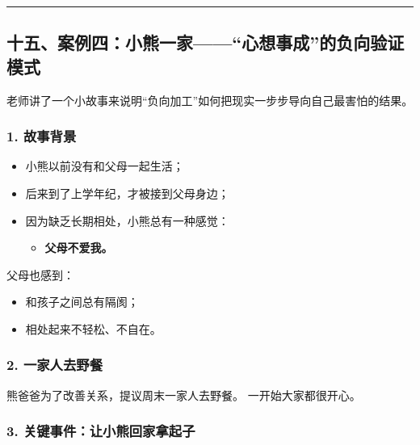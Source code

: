 \documentclass[
  chinese,
  9pt,
  a4paper,
]{ctexart}
\providecommand{\tightlist}{%
  \setlength{\itemsep}{0pt}\setlength{\parskip}{0pt}}
\begin{document}
\begin{center}\rule{0.5\linewidth}{0.5pt}\end{center}

\subsection{十五、案例四：小熊一家------``心想事成''的负向验证模式}\label{ux5341ux4e94ux6848ux4f8bux56dbux5c0fux718aux4e00ux5bb6ux5fc3ux60f3ux4e8bux6210ux7684ux8d1fux5411ux9a8cux8bc1ux6a21ux5f0f}

老师讲了一个小故事来说明``负向加工''如何把现实一步步导向自己最害怕的结果。

\subsubsection{1. 故事背景}\label{ux6545ux4e8bux80ccux666f}

\begin{itemize}
\item
  小熊以前没有和父母一起生活；
\item
  后来到了上学年纪，才被接到父母身边；
\item
  因为缺乏长期相处，小熊总有一种感觉：

  \begin{itemize}
  \tightlist
  \item
    \textbf{父母不爱我。}
  \end{itemize}
\end{itemize}

父母也感到：

\begin{itemize}
\tightlist
\item
  和孩子之间总有隔阂；
\item
  相处起来不轻松、不自在。
\end{itemize}

\subsubsection{2.
一家人去野餐}\label{ux4e00ux5bb6ux4ebaux53bbux91ceux9910}

熊爸爸为了改善关系，提议周末一家人去野餐。 一开始大家都很开心。

\subsubsection{3.
关键事件：让小熊回家拿起子}\label{ux5173ux952eux4e8bux4ef6ux8ba9ux5c0fux718aux56deux5bb6ux62ffux8d77ux5b50}
\end{document}
